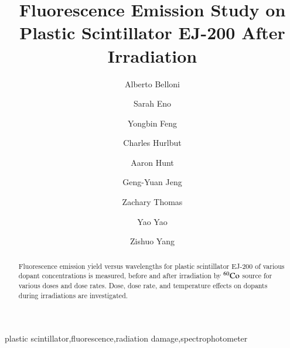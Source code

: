 \documentclass[preprint,12pt]{elsarticle}
\begin{document}
\begin{frontmatter}



\title{Fluorescence Emission Study on Plastic Scintillator EJ-200 After Irradiation}


\author[umd]{Alberto Belloni}
\author[umd]{Sarah Eno}
\author[umd]{Yongbin Feng}
\author[eljen]{Charles Hurlbut}
\author[umd]{Aaron Hunt}
\author[umd]{Geng-Yuan Jeng}
\author[umd]{Zachary Thomas}
\author[umd]{Yao Yao}
\author[umd]{Zishuo Yang}

\address[umd]{Department of Physics, University of Maryland, College Park, MD 20740, USA}
\address[eljen]{Eljen Technology, 1300 W. Broadway, Sweetwater, TX 79556, USA}

\begin{abstract}
Fluorescence emission yield versus wavelengths for plastic scintillator EJ-200 of various dopant concentrations is measured, 
before and after irradiation by $\rm {^{60}Co}$ source for various doses and dose rates. 
Dose, dose rate, and temperature effects on dopants during irradiations are investigated.
\end{abstract}

\begin{keyword}
plastic scintillator\sep fluorescence\sep radiation damage\sep spectrophotometer

\end{keyword}

\end{frontmatter}
\end{document}
